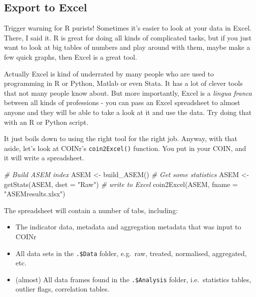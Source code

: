 \documentclass[
]{book}
\newenvironment{Shaded}{\begin{snugshade}}{\end{snugshade}}
\newcommand{\AttributeTok}[1]{\textcolor[rgb]{0.77,0.63,0.00}{#1}}
\newcommand{\CommentTok}[1]{\textcolor[rgb]{0.56,0.35,0.01}{\textit{#1}}}
\newcommand{\FunctionTok}[1]{\textcolor[rgb]{0.00,0.00,0.00}{#1}}
\newcommand{\NormalTok}[1]{#1}
\newcommand{\OtherTok}[1]{\textcolor[rgb]{0.56,0.35,0.01}{#1}}
\newcommand{\StringTok}[1]{\textcolor[rgb]{0.31,0.60,0.02}{#1}}
\providecommand{\tightlist}{%
  \setlength{\itemsep}{0pt}\setlength{\parskip}{0pt}}
\begin{document}
\hypertarget{export-to-excel}{%
\subsection{Export to Excel}\label{export-to-excel}}

Trigger warning for R purists! Sometimes it's easier to look at your data in Excel. There, I said it. R is great for doing all kinds of complicated tasks, but if you just want to look at big tables of numbers and play around with them, maybe make a few quick graphs, then Excel is a great tool.

Actually Excel is kind of underrated by many people who are used to programming in R or Python, Matlab or even Stata. It has a lot of clever tools that not many people know about. But more importantly, Excel is a \emph{lingua franca} between all kinds of professions - you can pass an Excel spreadsheet to almost anyone and they will be able to take a look at it and use the data. Try doing that with an R or Python script.

It just boils down to using the right tool for the right job. Anyway, with that aside, let's look at COINr's \texttt{coin2Excel()} function. You put in your COIN, and it will write a spreadsheet.

\begin{Shaded}
\begin{Highlighting}[]
\CommentTok{\# Build ASEM index}
\NormalTok{ASEM }\OtherTok{\textless{}{-}} \FunctionTok{build\_ASEM}\NormalTok{()}
\CommentTok{\# Get some statistics}
\NormalTok{ASEM }\OtherTok{\textless{}{-}} \FunctionTok{getStats}\NormalTok{(ASEM, }\AttributeTok{dset =} \StringTok{"Raw"}\NormalTok{)}
\CommentTok{\# write to Excel}
\FunctionTok{coin2Excel}\NormalTok{(ASEM, }\AttributeTok{fname =} \StringTok{"ASEMresults.xlsx"}\NormalTok{)}
\end{Highlighting}
\end{Shaded}

The spreadsheet will contain a number of tabs, including:

\begin{itemize}
\tightlist
\item
  The indicator data, metadata and aggregation metadata that was input to COINr
\item
  All data sets in the \texttt{.\$Data} folder, e.g.~raw, treated, normalised, aggregated, etc.
\item
  (almost) All data frames found in the \texttt{.\$Analysis} folder, i.e.~statistics tables, outlier flags, correlation tables.
\end{itemize}
\end{document}
